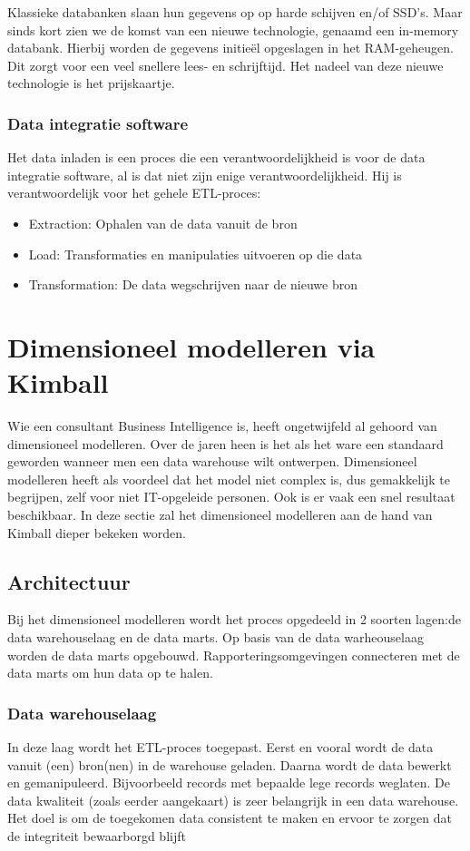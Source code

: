 Klassieke databanken slaan hun gegevens op op harde schijven en/of SSD's. Maar sinds kort zien we de komst van een nieuwe technologie, genaamd een in-memory databank. Hierbij worden de gegevens initieël opgeslagen in het RAM-geheugen. Dit zorgt voor een veel snellere lees- en schrijftijd. Het nadeel van deze nieuwe technologie is het prijskaartje.

\subsubsection{Data integratie software}
\label{sec:etl}
Het data inladen is een proces die een verantwoordelijkheid is voor de data integratie software, al is dat niet zijn enige verantwoordelijkheid. Hij is verantwoordelijk voor het gehele ETL-proces:

\begin{itemize}
	\item Extraction: Ophalen van de data vanuit de bron
	\item Load: Transformaties en manipulaties uitvoeren op die data
	\item Transformation: De data wegschrijven naar de nieuwe bron
\end{itemize} 

\section{Dimensioneel modelleren via Kimball}
Wie een consultant Business Intelligence is, heeft ongetwijfeld al gehoord van dimensioneel modelleren. Over de jaren heen is het als het ware een standaard geworden wanneer men een data warehouse wilt ontwerpen. Dimensioneel modelleren heeft als voordeel dat het model niet complex is, dus gemakkelijk te begrijpen, zelf voor niet IT-opgeleide personen. Ook is er vaak een snel resultaat beschikbaar. In deze sectie zal het dimensioneel modelleren aan de hand van Kimball dieper bekeken worden. 


\subsection{Architectuur}
Bij het dimensioneel modelleren wordt het proces opgedeeld in 2 soorten lagen:de data warehouselaag en de data marts. Op basis van de data warheouselaag worden de data marts opgebouwd. Rapporteringsomgevingen connecteren met de data marts om hun data op te halen.

\subsubsection{Data warehouselaag}
In deze laag wordt het ETL-proces toegepast. Eerst en vooral wordt de data vanuit (een) bron(nen) in de warehouse geladen. Daarna wordt de data bewerkt en gemanipuleerd. Bijvoorbeeld records met bepaalde lege records weglaten. De data kwaliteit (zoals eerder aangekaart) is zeer belangrijk in een data warehouse. Het doel is om de toegekomen data consistent te maken en ervoor te zorgen dat de integriteit bewaarborgd blijft ~\autocite{Kimball2013}

